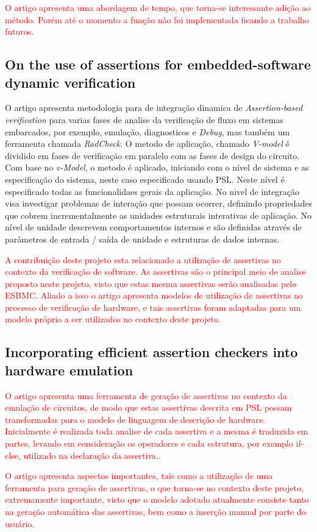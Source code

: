 \par
\textcolor{red}{O artigo apresenta uma abordagem de tempo, que torna-se interessante adição ao método. Porém até o momento a função não foi implementada ficando a trabalho futuros.}

\subsection{On the use of assertions for embedded-software dynamic verification}
O artigo apresenta metodologia para de integração dinamica de  \textit{Assertion-based verification} para varias fases de analise da verificação de fluxo em sistemas embarcados, por exemplo, emulação, diagnosticos e \textit{Debug}, mas também um ferramenta chamada \textit{RadCheck}. O metodo de aplicação, chamado \textit{V-model} é dividido em fases de verificação em paralelo com as fases de design do circuito. Com base no \textit{v-Model}, o metodo é aplicado, iniciando com o nível de sistema e as especificação do sistema, neste caso especificado usando PSL. Neste nível é especificado todas as funcionalidaes gerais da aplicação. No nivel de integração visa investigar problemas de interação que possam ocorrer, definindo propriedades que cobrem incrementalmente as unidades estruturais interativas de aplicação. No nível de unidade descrevem comportamentos internos e são definidas através de parâmetros de entrada / saída de unidade e estruturas de dados internas.\cite{di2012use}

\par
\textcolor{red}{A contribuição deste projeto esta relacionado a utilização de assertivas no contexto da verificação de software. As assertivas são o principal meio de analise proposto neste projeto, visto que estas mesma assertivas serão analisadas pelo ESBMC. Aliado a isso o artigo apresenta modelos de utilização de assertivas no processo de verificação de hardware, e tais assertivas foram adaptadas para um modelo próprio a ser utilizados no contexto deste projeto.}

\subsection{Incorporating efficient assertion checkers into hardware emulation}
\textcolor{red}{O artigo apresenta uma ferramenta de geração de assertivas no contexto da emulação de circuitos, de modo que estas assertivas descrita em PSL possam transformadas para o modelo de linguagem de descrição de hardware. Inicialmente é realizada toda analise de cada assertiva e a mesma é traduzida em partes, levando em consideração os operadores e cada estrutura, por exemplo if-else, utilizado na declaração da assertiva.\cite{boule2005incorporating}.}

\par
\textcolor{red}{O artigo apresenta aspectos importantes, tais como a utilização de uma ferramenta para geração de assertivas, o que torna-se no contexto deste projeto, extremamente importante, visto que o modelo adotado atualmente consiste tanto na geração automática das assertivas, bem como a inserção manual por parte do usuário.}